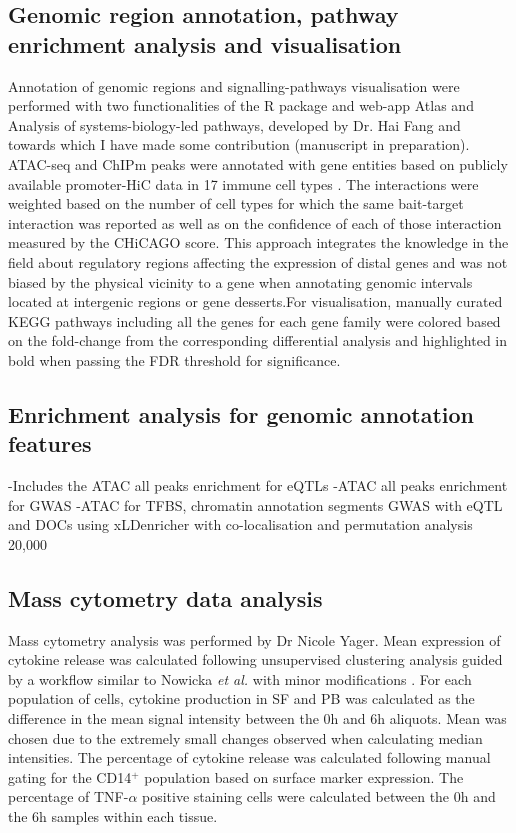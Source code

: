\subsection{Genomic region annotation, pathway enrichment analysis and visualisation}
Annotation of genomic regions and signalling-pathways visualisation were performed with two functionalities of the R package and web-app Atlas and Analysis of systems-biology-led pathways, developed by Dr. Hai Fang and towards which I have made some contribution (manuscript in preparation). ATAC-seq and ChIPm peaks were annotated with gene entities based on publicly available promoter-HiC data in 17 immune cell types \parencite{Javierre2016}. The interactions were weighted based on the number of cell types for which the same bait-target interaction was reported as well as on the confidence of each of those interaction measured by the CHiCAGO score. This approach integrates the knowledge in the field about regulatory regions affecting the expression of distal genes and was not biased by the physical vicinity to a gene when annotating genomic intervals located at intergenic regions or gene desserts.For visualisation, manually curated KEGG pathways including all the genes for each gene family were colored based on the fold-change from the corresponding differential analysis and highlighted in bold when passing the FDR threshold for significance.

 \subsection{Enrichment analysis for genomic annotation features}
-Includes the ATAC all peaks enrichment for eQTLs 
-ATAC all peaks enrichment for GWAS
-ATAC for TFBS, chromatin annotation segments
GWAS with eQTL and DOCs using xLDenricher with co-localisation and permutation analysis 20,000


\subsection{Mass cytometry data analysis}
Mass cytometry analysis was performed by Dr Nicole Yager. Mean expression of cytokine release was calculated following unsupervised clustering analysis guided by a workflow similar to Nowicka \textit{et al.} with minor modifications \parencite{Nowicka 2017}. For each population of cells, cytokine production in SF and PB was calculated as the difference in the mean signal intensity between the 0h and 6h aliquots. Mean was chosen due to the extremely small changes observed when calculating median intensities. The percentage of cytokine release was calculated following manual gating for the CD14$^+$ population based on surface marker expression.  The percentage of TNF-$\alpha$ positive staining cells were calculated between the 0h and the 6h samples within each tissue.



